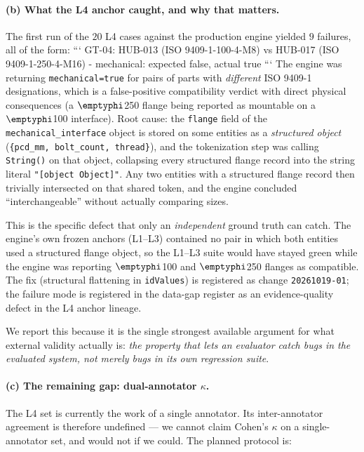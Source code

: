 \documentclass[review]{elsarticle}
\begin{document}
\paragraph{(b) What the L4 anchor caught, and why that matters.}
The first run of the $20$ L4 cases against the production engine
yielded $9$ failures, all of the form:
```
GT-04: HUB-013 (ISO 9409-1-100-4-M8) vs HUB-017 (ISO 9409-1-250-4-M16)
     - mechanical: expected false, actual true
```
The engine was returning \texttt{mechanical=true} for pairs of parts
with \emph{different} ISO 9409-1 designations, which is a
false-positive compatibility verdict with direct physical
consequences (a $\emptyphi$250 flange being reported as mountable on a
$\emptyphi$100 interface). Root cause: the \texttt{flange} field of
the \texttt{mechanical\_interface} object is stored on some entities
as a \emph{structured object} (\texttt{\{pcd\_mm, bolt\_count,
thread\}}), and the tokenization step was calling \texttt{String()}
on that object, collapsing every structured flange record into the
string literal \texttt{"[object Object]"}. Any two entities with a
structured flange record then trivially intersected on that shared
token, and the engine concluded ``interchangeable'' without actually
comparing sizes.

This is the specific defect that only an \emph{independent} ground
truth can catch. The engine's own frozen anchors (L1--L3) contained
no pair in which both entities used a structured flange object, so
the L1--L3 suite would have stayed green while the engine was
reporting $\emptyphi$100 and $\emptyphi$250 flanges as compatible. The
fix (structural flattening in \texttt{idValues}) is registered as
change \texttt{20261019-01}; the failure mode is registered in the
data-gap register as an evidence-quality defect in the L4 anchor
lineage.

We report this because it is the single strongest available
argument for what external validity actually is: \emph{the property
that lets an evaluator catch bugs in the evaluated system, not
merely bugs in its own regression suite}.

\paragraph{(c) The remaining gap: dual-annotator $\kappa$.}
The L4 set is currently the work of a single annotator. Its
inter-annotator agreement is therefore undefined --- we cannot claim
Cohen's $\kappa$ on a single-annotator set, and would not if we
could. The planned protocol is:
\end{document}
